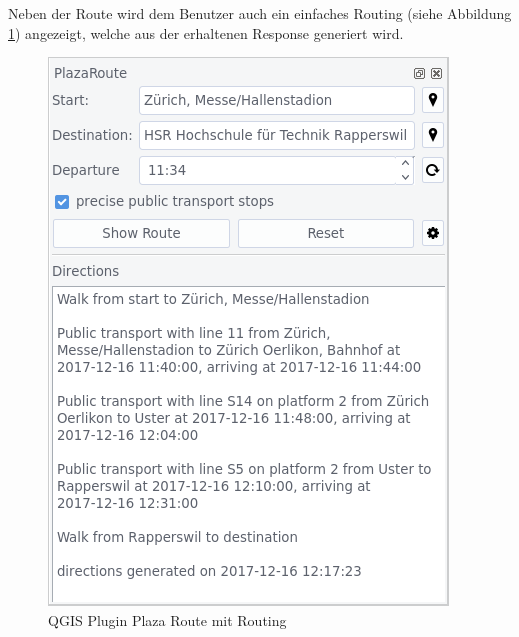 Neben der Route wird dem Benutzer auch ein einfaches Routing (siehe Abbildung \ref{fig:qgis_plugin_plaza_route_routing}) angezeigt, welche aus der erhaltenen Response generiert wird.

\begin{figure}[ht]
\centering
\includegraphics[width=0.7\linewidth]{projectdoc/img/qgis_plugin_plaza_route_routing}
\caption[QGIS Plugin Plaza Route mit Routing]{QGIS Plugin Plaza Route mit Routing}
\label{fig:qgis_plugin_plaza_route_routing}
\end{figure}

